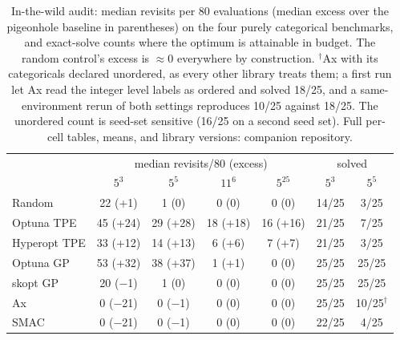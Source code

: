 \documentclass[%
 aip,
 amsmath,amssymb,
 floatfix,
 reprint,%
]{revtex4-1}
\begin{document}
\begin{table}[t]
\caption{\label{tab:wild}In-the-wild audit: median revisits per 80
evaluations (median excess over the pigeonhole baseline in parentheses)
on the four purely categorical benchmarks, and exact-solve counts where
the optimum is attainable in budget. The random control's excess is
${\approx}0$ everywhere by construction. $^{\dagger}$Ax with its
categoricals declared unordered, as every other library treats them; a
first run let Ax read the integer level labels as ordered and solved
18/25, and a same-environment rerun of both settings reproduces 10/25
against 18/25. The unordered count is seed-set sensitive (16/25 on a
second seed set). Full per-cell tables, means,
and library versions: companion repository.}
\begin{ruledtabular}
\begin{tabular}{lcccccc}
 & \multicolumn{4}{c}{median revisits/80 (excess)} &
 \multicolumn{2}{c}{solved} \\
 & $5^3$ & $5^5$ & $11^6$ & $5^{25}$ & $5^3$ & $5^5$ \\
\hline
Random          & 22 (+1)  & 1 (0)   & 0 (0)  & 0 (0)  & 14/25 & 3/25 \\
Optuna TPE      & 45 (+24) & 29 (+28) & 18 (+18) & 16 (+16) & 21/25 & 7/25 \\
Hyperopt TPE    & 33 (+12) & 14 (+13) & 6 (+6) & 7 (+7) & 21/25 & 3/25 \\
Optuna GP       & 53 (+32) & 38 (+37) & 1 (+1) & 0 (0)  & 25/25 & 25/25 \\
skopt GP        & 20 ($-$1) & 1 (0)  & 0 (0)  & 0 (0)  & 25/25 & 25/25 \\
Ax              & 0 ($-$21) & 0 ($-$1) & 0 (0) & 0 (0)  & 25/25 & 10/25$^{\dagger}$ \\
SMAC            & 0 ($-$21) & 0 ($-$1) & 0 (0) & 0 (0)  & 22/25 & 4/25 \\
\end{tabular}
\end{ruledtabular}
\end{table}
\end{document}
